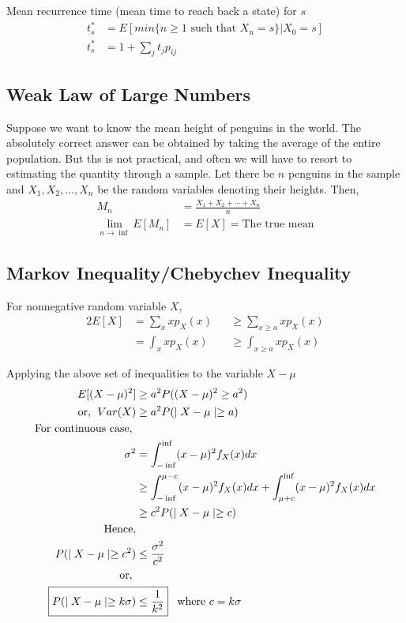 \documentclass[11pt, a4paper]{article}
\begin{document}
    Mean recurrence time (mean time to reach back a state) for $s$
    \begin{align*}
        t_{s}^{*} &= E[min\{n \geq 1 \text{ such that } X_{n}=s\} | X_{0} = s] \\
        t_{s}^{*} &= 1 + \sum_{j} t_{j} p_{ij}
    \end{align*}

    \subsection{Weak Law of Large Numbers}
    Suppose we want to know the mean height of penguins in the world. The absolutely correct answer can be obtained by taking the average of the entire population. But ths is not practical, and often we will have to resort to estimating the quantity through a sample. Let there be $n$ penguins in the sample and $X_{1}, X_{2}, \ldots, X_{n}$ be the random variables denoting their heights. Then,
    \begin{align*}
        M_{n} &= \frac{X_{1} + X_{2} + \cdots + X_{n}}{n}\\
        \lim_{n \to \inf} E[M_{n}] &= E[X] = \text{The true mean}
    \end{align*}

    \subsection{Markov Inequality/Chebychev Inequality}
    For nonnegative random variable $X$,
    \begin{alignat*}{2}
        E[X] &= \sum_{x}xp_{X}(x) &&\geq \sum_{x \geq a}xp_{X}(x) \tag*{discrete case}\\
            &= \int_{x}xp_{X}(x) &&\geq \int_{x \geq a}xp_{X}(x) \tag*{continuous case}
    \end{alignat*}
    
    Applying the above set of inequalities to the variable $X - \mu$
    \begin{align*}
        E[(X - \mu)^{2}] &\geq a^{2} P((X - \mu)^{2} \geq a^{2}) \\
        \text{or, \;} Var(X) &\geq a^{2} P(\mid X - \mu \mid \geq a)\\
        \text{For continuous case, }\\
        \sigma^{2} &= \int_{-\inf}^{\inf} (x-\mu)^{2}f_{X}(x) dx\\
                  &\geq \int_{-\inf}^{\mu-c} (x-\mu)^{2}f_{X}(x)dx + \int_{\mu+c}^{\inf} (x-\mu)^{2}f_{X}(x)dx\\
                  &\geq c^{2} P(\mid X - \mu \mid \geq c)\\
        \text{Hence,}\\
        P(\mid X - \mu \mid \geq c^{2}) &\leq \frac{\sigma^{2}}{c^{2}}\\
        \text{or, } \\
        \Aboxed{P(\mid X - \mu \mid \geq k\sigma) &\leq \frac{1}{k^{2}}}\text{\;\;\;where $c = k\sigma$}
    \end{align*}
\end{document}
